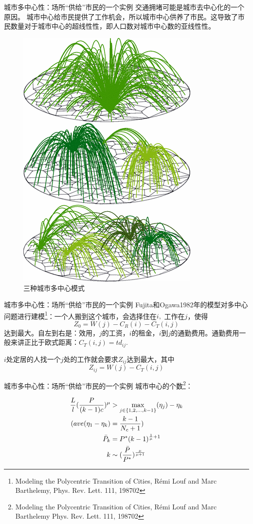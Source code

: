 \documentclass[utf8]{ctexbeamer}
\begin{document}
\begin{frame}{城市多中心性：场所“供给”市民的一个实例}
    交通拥堵可能是城市去中心化的一个原因。
    \flushleft
    城市中心给市民提供了工作机会，所以城市中心供养了市民。这导致了市民数量对于城市中心的超线性性，即人口数对城市中心数的亚线性性。
    \begin{figure}
        \centering
        \includegraphics[width = 0.25\linewidth]{图片/polycentric.png}
        \caption{三种城市多中心模式}
    \end{figure}
\end{frame}
\begin{frame}{城市多中心性：场所“供给”市民的一个实例}
    Fujita和Ogawa1982年的模型对多中心问题进行建模\footnote{Modeling the Polycentric Transition of Cities, Rémi Louf and Marc Barthelemy, Phys. Rev. Lett. 111, 198702}：一个人搬到这个城市，会选择住在$i,$ 工作在$j$，使得\[Z_0 = W(j)-C_R(i)-C_T(i,j)\]达到最大。自左到右是：效用，$j$的工资，$i$的租金，$i$到$j$的通勤费用。通勤费用一般来讲正比于欧式距离：$C_T(i,j) = td_{ij}$.

    $i$处定居的人找一个$j$处的工作就会要求$Z_{ij}$达到最大，其中\[Z_{ij} = W(j)-C_T(i,j)\]
\end{frame}

\begin{frame}{城市多中心性：场所“供给”市民的一个实例}
城市中心的个数\footnote{Modeling the Polycentric Transition of Cities, Rémi Louf and Marc Barthelemy
Phys. Rev. Lett. 111, 198702}：

    \begin{align}
        \frac{L}{l}(\frac{P}{(k-1)c})^\mu&>\max_{j\in\{1,2,\ldots,k-1\}}(\eta_j)-\eta_k\notag\\
    (ave({\eta_1-\eta_k})&=\frac{k-1}{N_c+1})\notag\\
    \bar P_k &= P^{*}(k-1)^{\frac{1}{\mu}+1}\notag\\
    k&\sim(\frac{\bar P}{P^{*}})^\frac{\mu}{\mu+1}
    \end{align}
\end{frame}
\end{document}
